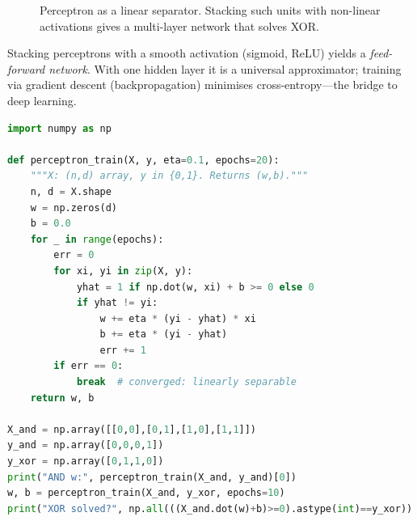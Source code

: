 \begin{figure}[h!]
\centering
{}
\caption{Perceptron as a linear separator. Stacking such units with non-linear activations gives a multi-layer network that solves XOR.}
\label{fig:perceptron}
\end{figure}

Stacking perceptrons with a smooth activation (sigmoid, ReLU) yields a \emph{feed-forward network}. With one hidden layer it is a universal approximator; training via gradient descent (backpropagation) minimises cross-entropy---the bridge to deep learning.

\begin{lstlisting}[language=Python, caption={Perceptron learning rule from scratch}, label={lst:perceptron}]
import numpy as np

def perceptron_train(X, y, eta=0.1, epochs=20):
    """X: (n,d) array, y in {0,1}. Returns (w,b)."""
    n, d = X.shape
    w = np.zeros(d)
    b = 0.0
    for _ in range(epochs):
        err = 0
        for xi, yi in zip(X, y):
            yhat = 1 if np.dot(w, xi) + b >= 0 else 0
            if yhat != yi:
                w += eta * (yi - yhat) * xi
                b += eta * (yi - yhat)
                err += 1
        if err == 0:
            break  # converged: linearly separable
    return w, b

X_and = np.array([[0,0],[0,1],[1,0],[1,1]])
y_and = np.array([0,0,0,1])
y_xor = np.array([0,1,1,0])
print("AND w:", perceptron_train(X_and, y_and)[0])
w, b = perceptron_train(X_and, y_xor, epochs=10)
print("XOR solved?", np.all(((X_and.dot(w)+b)>=0).astype(int)==y_xor))
\end{lstlisting}

